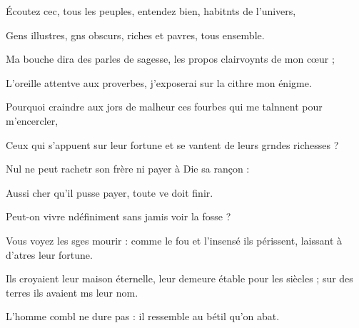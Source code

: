 \item Écoutez cec, tous les peuples,\psstar{} entendez bien, habitnts de l’univers,
\item Gens illustres, gns obscurs,\psstar{} riches et pavres, tous ensemble.
\item Ma bouche dira des parles de sagesse,\psstar{} les propos clairvoynts de mon cœur ;
\item L’oreille attentve aux proverbes,\psstar{} j’exposerai sur la cithre mon énigme.
\item Pourquoi craindre aux jors de malheur\psstar{} ces fourbes qui me talnnent pour m’encercler,
\item Ceux qui s’appuent sur leur fortune\psstar{} et se vantent de leurs grndes richesses ?
\item Nul ne peut rachetr son frère\psstar{} ni payer à Die sa rançon :
\item Aussi cher qu’il pusse payer,\psstar{} toute ve doit finir.
\item Peut-on vivre ndéfiniment\psstar{} sans jamis voir la fosse ?
\item Vous voyez les sges mourir :\psstar{} comme le fou et l’insensé ils périssent, laissant à d’atres leur fortune.
\item Ils croyaient leur maison éternelle,\pscross{} leur demeure étable pour les siècles ;\psstar{} sur des terres ils avaient ms leur nom.
\item L’homme combl ne dure pas :\psstar{} il ressemble au bétil qu’on abat.
